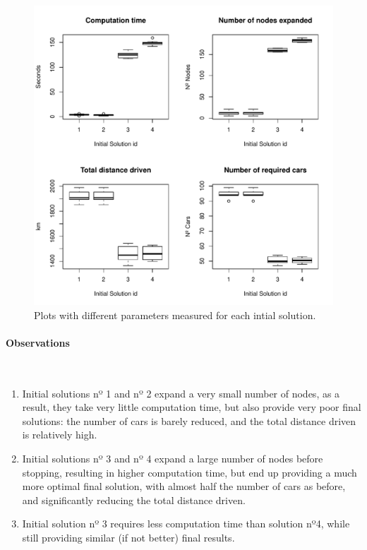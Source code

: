 \documentclass[12]{article}
\begin{document}
\begin{figure}[H]
\captionsetup{justification=centering}
\centering
\includegraphics[width=\textwidth,height=\textheight, keepaspectratio]{Results/data_2.pdf}
\caption{Plots with different parameters measured for each intial solution.}
\label{operators}
\end{figure}

\paragraph{Observations}\mbox{}\\
\begin{enumerate}
\item Initial solutions nº 1 and nº 2 expand a very small number of nodes, as a result, they take very little computation time,
but also provide very poor final solutions: the number of cars is barely reduced, and the total distance driven is relatively high.

\item Initial solutions nº 3 and nº 4 expand a large number of nodes before stopping, resulting in higher computation time,
but end up providing a much more optimal final solution, with almost half the number of cars as before, and significantly reducing the total distance driven.

\item Initial solution nº 3 requires less computation time than solution nº4, while still providing similar (if not better) final results.

\end{enumerate}
\end{document}
